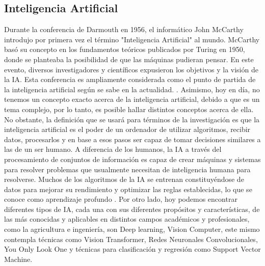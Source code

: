 \subsection{Inteligencia Artificial}
 Durante la conferencia de Darmouth en 1956, el informático John McCarthy introdujo por primera vez el término "Inteligencia Artificial" al mundo. McCarthy basó su concepto en los fundamentos teóricos publicados por Turing en 1950, donde se planteaba la posibilidad de que las máquinas pudieran pensar. En este evento, diversos investigadores y científicos expusieron los objetivos y la visión de la IA. Esta conferencia es ampliamente considerada como el punto de partida de la inteligencia artificial según se sabe en la actualidad. \parencite{teamredac2022}.
 Asimismo, hoy en día, no tenemos un concepto exacto acerca de la inteligencia artificial, debido a que es un tema complejo, por lo tanto, es posible hallar distintos conceptos acerca de ella. No obstante, la definición que se usará para términos de la investigación es que la inteligencia artificial es el poder de un ordenador de utilizar algoritmos, recibir datos, procesarlos y en base a esos pasos ser capaz de tomar decisiones similares a las de un ser humano. A diferencia de los humanos, la IA a través del procesamiento de conjuntos de información es capaz de crear máquinas y sistemas para resolver problemas que usualmente necesitan de inteligencia humana para resolverse. Muchos de los algoritmos de la IA se entrenan constituyéndose de datos para mejorar su rendimiento y optimizar las reglas establecidas, lo que se conoce como aprendizaje profundo \parencites{rouhiainen2018inteligencia}{ricardo2021inteligencia}{cajahuanca2021inteligencia}. 
 Por otro lado, hoy podemos encontrar diferentes tipos de IA, cada una con sus diferentes propósitos y características, de las más conocidas y aplicables en distintos campos académicos y profesionales, como la agricultura e ingeniería, son  Deep learning,  Vision Computer, este mismo contempla técnicas como Vision Transformer, Redes Neuronales Convolucionales, You Only Look One y técnicas para clasificación y regresión como Support Vector Machine.
 
